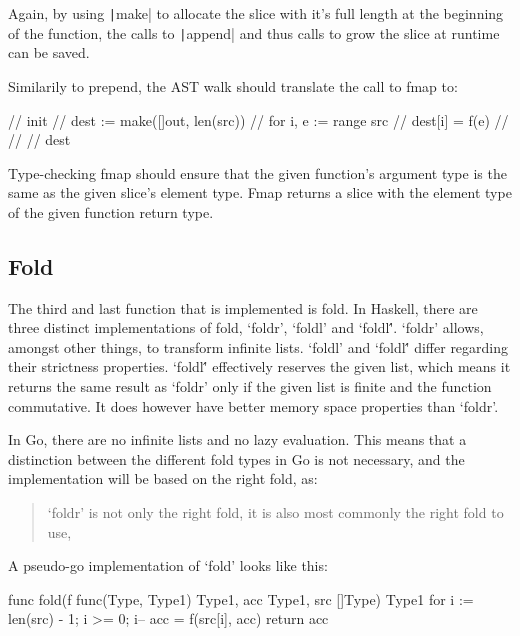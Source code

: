 Again, by using \texttt|make| to allocate the slice with it's full length at the beginning
of the function, the calls to \texttt|append| and thus calls to grow the
slice at runtime can be saved.

Similarily to prepend, the AST walk should translate the call to fmap to:
\begin{code}
    \begin{gocode}
//   init {
//     dest := make([]out, len(src))
//     for i, e := range src {
//       dest[i] = f(e)
//     }
//   }
//   dest
    \end{gocode}
\end{code}

Type-checking fmap should ensure that the given function's argument type is the same
as the given slice's element type. Fmap returns a slice with the element type of
the given function return type.

\subsection{Fold}

The third and last function that is implemented is fold.
In Haskell, there are three distinct implementations of fold, `foldr', `foldl' and `foldl\''.
`foldr' allows, amongst other things, to transform infinite lists. `foldl' and `foldl\''
differ regarding their strictness properties. `foldl\'' effectively reserves the given list,
which means it returns the same result as `foldr' only if the given list is finite and the
function commutative. It does however have better memory space properties than `foldr'.

In Go, there are no infinite lists and no lazy evaluation. This means that a distinction
between the different fold types in Go is not necessary, and the implementation will
be based on the right fold, as:

\begin{quote}
    `foldr' is not only the right fold, it is also most commonly the right fold to use,
\end{quote}\cite{fold-types}

A pseudo-go implementation of `fold' looks like this:
\begin{code}
    \begin{gocode}
func fold(f func(Type, Type1) Type1, acc Type1, src []Type) Type1 {
    for i := len(src) - 1; i >= 0; i-- {
        acc = f(src[i], acc)
    }
    return acc
}
    \end{gocode}
\end{code}

